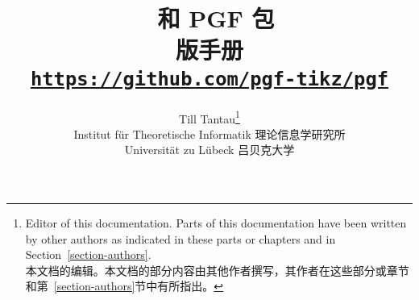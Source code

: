 \title{\tikzname\ 和 {\Large PGF} 包\\
  \large \pgfversion 版手册\\[1mm]
   
\large\href{https://github.com/pgf-tikz/pgf}{\texttt{https://github.com/pgf-tikz/pgf}}}
\author{Till Tantau\footnote{Editor of this documentation. Parts of
    this documentation have been written by other authors as indicated
    in these parts or chapters and in Section~\ref{section-authors}.\\本文档的编辑。本文档的部分内容由其他作者撰写，其作者在这些部分或章节和第~\ref{section-authors}节中有所指出。}\\
  \normalsize Institut für Theoretische Informatik 理论信息学研究所\\[-1mm]
  \normalsize Universität zu Lübeck 吕贝克大学}

\maketitle
\label{table-of-contents}

\tableofcontents 

\clearpage

